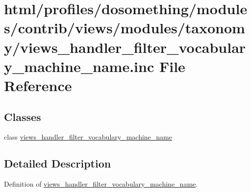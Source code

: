 \hypertarget{views__handler__filter__vocabulary__machine__name_8inc}{
\section{html/profiles/dosomething/modules/contrib/views/modules/taxonomy/views\_\-handler\_\-filter\_\-vocabulary\_\-machine\_\-name.inc File Reference}
\label{views__handler__filter__vocabulary__machine__name_8inc}
}
\subsection*{Classes}
\begin{DoxyCompactItemize}
\item 
class \hyperlink{classviews__handler__filter__vocabulary__machine__name}{views\_\-handler\_\-filter\_\-vocabulary\_\-machine\_\-name}
\end{DoxyCompactItemize}


\subsection{Detailed Description}
Definition of \hyperlink{classviews__handler__filter__vocabulary__machine__name}{views\_\-handler\_\-filter\_\-vocabulary\_\-machine\_\-name}. 